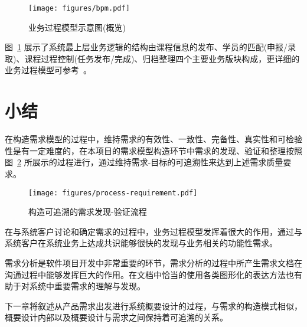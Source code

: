 \begin{figure}[!h]
  \begin{center}
    \texttt{[image: figures/bpm.pdf]}
    \caption{业务过程模型示意图(概览)\label{BPMOverview}}
  \end{center}
\end{figure}

图~\ref{BPMOverview} 展示了系统最上层业务逻辑的结构由课程信息的发布、学员的匹配(申报/录取)、课程过程控制(任务发布/完成)、归档整理四个主要业务版块构成，更详细的业务过程模型可参考~。

\section{小结}

在构造需求模型的过程中，维持需求的有效性、一致性、完备性、真实性和可检验性是有一定难度的，在本项目的需求模型构造环节中需求的发现、验证和整理按照图~\ref{RequirementExtraction} 所展示的过程进行，通过维持需求-目标的可追溯性来达到上述需求质量要求。

\begin{figure}[!h]
  \begin{center}
    \texttt{[image: figures/process-requirement.pdf]}
    \caption{构造可追溯的需求发现-验证流程\label{RequirementExtraction}}
  \end{center}
\end{figure}

在与系统客户讨论和确定需求的过程中，业务过程模型发挥着很大的作用，通过与系统客户在系统业务上达成共识能够很快的发现与业务相关的功能性需求。

需求分析是软件项目开发中非常重要的环节，需求分析的过程中所产生需求文档在沟通过程中能够发挥巨大的作用。在文档中恰当的使用各类图形化的表达方法也有助于对系统中重要需求的理解与发现。

下一章将叙述从产品需求出发进行系统概要设计的过程，与需求的构造模式相似，概要设计内部以及概要设计与需求之间保持着可追溯的关系。

